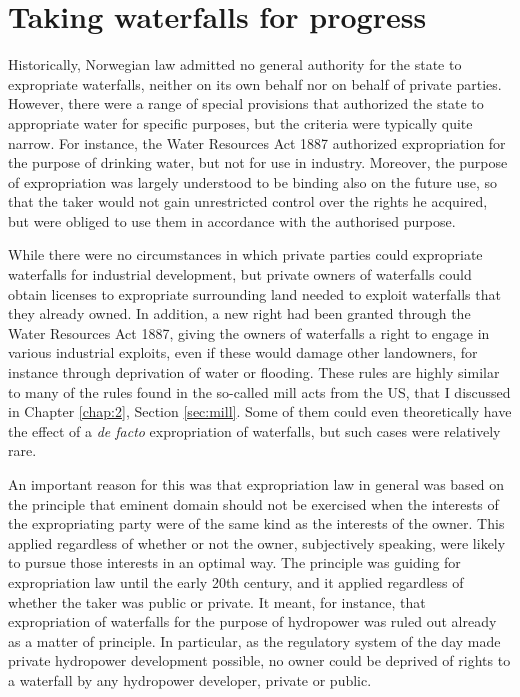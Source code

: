 \section{Taking waterfalls for progress}\label{sec:twp}

Historically, Norwegian law admitted no general authority for the state to expropriate waterfalls, neither on its own behalf nor on behalf of private parties. However, there were a range of special provisions that authorized the state to appropriate water for specific purposes, but the criteria were typically quite narrow. For instance, the Water Resources Act 1887 authorized expropriation for the purpose of drinking water, but not for use in industry. Moreover, the purpose of expropriation was largely understood to be binding also on the future use, so that the taker would not gain unrestricted control over the rights he acquired, but were obliged to use them in accordance with the authorised purpose.

While there were no circumstances in which private parties could expropriate waterfalls for industrial development, but private owners of waterfalls could obtain licenses to expropriate surrounding land needed to exploit waterfalls that they already owned. In addition, a new right had been granted through the Water Resources Act 1887, giving the owners of waterfalls a right to engage in various industrial exploits, even if these would damage other landowners, for instance through deprivation of water or flooding. These rules are highly similar to many of the rules found in the so-called mill acts from the US, that I discussed in Chapter \ref{chap:2}, Section \ref{sec:mill}. Some of them could even theoretically have the effect of a {\it de facto} expropriation of waterfalls, but such cases were relatively rare.

An important reason for this was that expropriation law in general was based on the principle that eminent domain should not be exercised when the interests of the expropriating party were of the same kind as the interests of the owner. This applied regardless of whether or not the owner, subjectively speaking, were likely to pursue those interests in an optimal way. The principle was guiding for expropriation law until the early 20th century, and it applied regardless of whether the taker was public or private. It meant, for instance, that expropriation of waterfalls for the purpose of hydropower was ruled out already as a matter of principle. In particular, as the regulatory system of the day made private hydropower development possible, no owner could be deprived of rights to 
a waterfall by any hydropower developer, private or public. 

